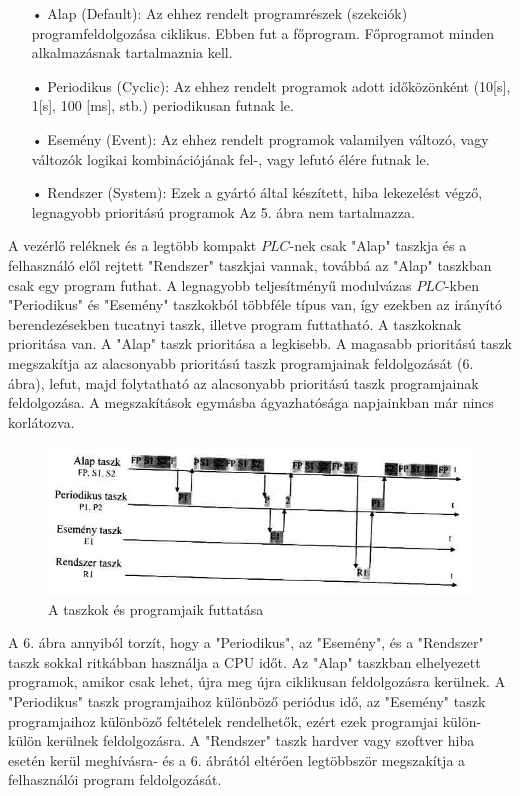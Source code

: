 \documentclass[11pt,a4paper]{article}
\begin{document}
\begin{enumerate}
	\item[•]Alap (Default): Az ehhez rendelt programrészek (szekciók) programfeldolgozása ciklikus. Ebben fut a főprogram. Főprogramot minden alkalmazásnak tartalmaznia kell.
	\item[•]Periodikus (Cyclic): Az ehhez rendelt programok adott időközönként (10[s], 1[s], 100 [ms], stb.) periodikusan futnak le.
	\item[•]Esemény (Event): Az ehhez rendelt programok valamilyen változó, vagy változók logikai kombinációjának fel-, vagy lefutó élére futnak le.
	\item[•]Rendszer (System): Ezek a gyártó által készített, hiba lekezelést végző, legnagyobb prioritású programok Az 5. ábra nem tartalmazza. 
\end{enumerate}
A vezérlő reléknek és a legtöbb kompakt $PLC$-nek csak "Alap" taszkja és a felhasználó elől rejtett "Rendszer" taszkjai vannak, továbbá az "Alap" taszkban csak egy program futhat. A legnagyobb teljesítményű modulvázas $PLC$-kben "Periodikus" és "Esemény" taszkokból többféle típus van, így ezekben az irányító berendezésekben tucatnyi taszk, illetve program futtatható.
A taszkoknak prioritása van. A "Alap" taszk prioritása a legkisebb. A  magasabb prioritású taszk megszakítja az alacsonyabb prioritású taszk programjainak feldolgozását (6. ábra), lefut, majd folytatható az alacsonyabb prioritású taszk programjainak feldolgozása. A megszakítások egymásba ágyazhatósága napjainkban már nincs korlátozva.
\begin{figure}[hbtp]
    	 \centering
		\includegraphics[scale=0.7]{6_tasz_futas.png}
		\caption{A taszkok és programjaik futtatása}
\end{figure}
A 6. ábra annyiból torzít, hogy a "Periodikus", az "Esemény", és a "Rendszer" taszk sokkal ritkábban használja a CPU időt. Az "Alap" taszkban  elhelyezett programok, amikor csak lehet, újra meg újra ciklikusan feldolgozásra kerülnek. A "Periodikus" taszk programjaihoz különböző periódus idő, az "Esemény" taszk programjaihoz különböző feltételek rendelhetők, ezért ezek programjai külön-külön kerülnek feldolgozásra. A "Rendszer" taszk hardver vagy szoftver hiba esetén kerül meghívásra- és a 6. ábrától eltérően legtöbbször megszakítja a felhasználói program feldolgozását.
\end{document}
